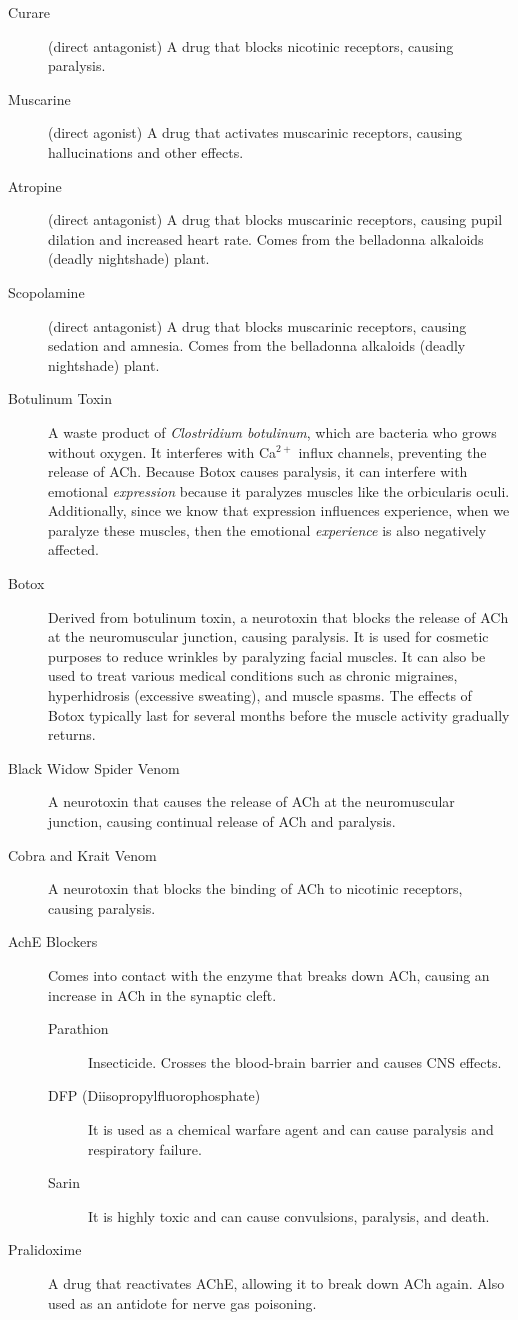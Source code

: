 \begin{description}
    \item[Curare] (direct antagonist)  A drug that blocks nicotinic receptors, causing paralysis.
    \item[Muscarine] (direct agonist)  A drug that activates muscarinic receptors, causing hallucinations and other effects.
    \item[Atropine] (direct antagonist)  A drug that blocks muscarinic receptors, causing pupil dilation and increased heart rate. Comes from the belladonna alkaloids (deadly nightshade) plant.
    \item[Scopolamine] (direct antagonist)  A drug that blocks muscarinic receptors, causing sedation and amnesia. Comes from the belladonna alkaloids (deadly nightshade) plant.
    \item[Botulinum Toxin]  A waste product of \textit{Clostridium botulinum}, which are bacteria who grows without oxygen. It interferes with Ca\(^{2+}\) influx channels, preventing the release of ACh. Because Botox causes paralysis, it can interfere with emotional \textit{expression} because it paralyzes muscles like the orbicularis oculi. Additionally, since we know that expression influences experience, when we paralyze these muscles, then the emotional \textit{experience} is also negatively affected.
    \item[Botox] Derived from botulinum toxin, a neurotoxin that blocks the release of ACh at the neuromuscular junction, causing paralysis. It is used for cosmetic purposes to reduce wrinkles by paralyzing facial muscles. It can also be used to treat various medical conditions such as chronic migraines, hyperhidrosis (excessive sweating), and muscle spasms. The effects of Botox typically last for several months before the muscle activity gradually returns. 
    \item[Black Widow Spider Venom] A neurotoxin that causes the release of ACh at the neuromuscular junction, causing continual release of ACh and paralysis.
    \item[Cobra and Krait Venom] A neurotoxin that blocks the binding of ACh to nicotinic receptors, causing paralysis.
    \item[AchE Blockers] Comes into contact with the enzyme that breaks down ACh, causing an increase in ACh in the synaptic cleft.
         \begin{description}
             \item[Parathion] Insecticide. Crosses the blood-brain barrier and causes CNS effects.
             \item[DFP (Diisopropylfluorophosphate)] It is used as a chemical warfare agent and can cause paralysis and respiratory failure.
             \item[Sarin] It is highly toxic and can cause convulsions, paralysis, and death.
         \end{description}
    \item[Pralidoxime] A drug that reactivates AChE, allowing it to break down ACh again. Also used as an antidote for nerve gas poisoning. 
\end{description}

